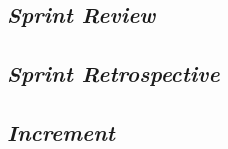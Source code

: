\begin{spacing}{1.5}
	\subsection{\textit{Sprint Review}}
	\subsection{\textit{Sprint Retrospective}}
	
	\subsection{\textit{Increment}}
\end{spacing}